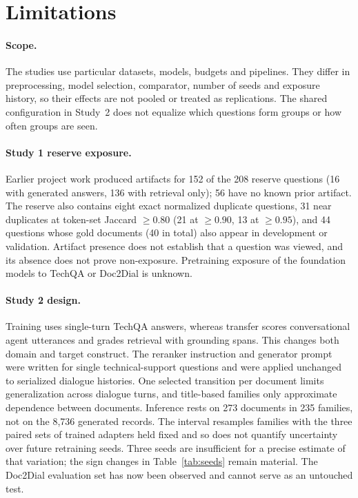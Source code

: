 \section{Limitations}\label{sec:limitations}
\paragraph{Scope.} The studies use particular datasets, models, budgets and pipelines. They differ in preprocessing, model selection, comparator, number of seeds and exposure history, so their effects are not pooled or treated as replications. The shared configuration in Study~2 does not equalize which questions form groups or how often groups are seen.

\paragraph{Study 1 reserve exposure.} Earlier project work produced artifacts for 152 of the 208 reserve questions (16 with generated answers, 136 with retrieval only); 56 have no known prior artifact. The reserve also contains eight exact normalized duplicate questions, 31 near duplicates at token-set Jaccard $\ge 0.80$ (21 at $\ge 0.90$, 13 at $\ge 0.95$), and 44 questions whose gold documents (40 in total) also appear in development or validation. Artifact presence does not establish that a question was viewed, and its absence does not prove non-exposure. Pretraining exposure of the foundation models to TechQA or Doc2Dial is unknown.

\paragraph{Study 2 design.} Training uses single-turn TechQA answers, whereas transfer scores conversational agent utterances and grades retrieval with grounding spans. This changes both domain and target construct. The reranker instruction and generator prompt were written for single technical-support questions and were applied unchanged to serialized dialogue histories. One selected transition per document limits generalization across dialogue turns, and title-based families only approximate dependence between documents. Inference rests on 273 documents in 235 families, not on the 8,736 generated records. The interval resamples families with the three paired sets of trained adapters held fixed and so does not quantify uncertainty over future retraining seeds. Three seeds are insufficient for a precise estimate of that variation; the sign changes in Table~\ref{tab:seeds} remain material. The Doc2Dial evaluation set has now been observed and cannot serve as an untouched test.

